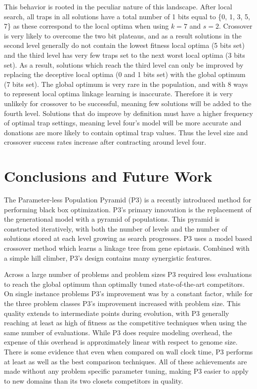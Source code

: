 \documentclass[twoside]{article}
\begin{document}
This behavior is rooted in the peculiar nature
of this landscape.
After local search, all traps in all solutions have a total
number of 1 bits equal to \{0, 1, 3, 5, 7\} as these correspond to the local
optima when using $k=7$ and $s=2$. Crossover is very likely to overcome the
two bit plateaus, and as a result solutions in the second level generally do not
contain the lowest fitness local optima (5 bits set) and the third
level has very few traps set to the next worst local optima (3 bits set). As a result,
solutions which reach the third level can only be improved by replacing the deceptive
local optima (0 and 1 bits set) with the global optimum (7 bits set).
The global optimum is very rare in the population, and with 8 ways to represent local optima
linkage learning is inaccurate. Therefore it is very unlikely for crossover to be successful,
meaning few solutions will be added to the fourth level. Solutions that do improve by
definition must have a higher frequency of optimal trap settings, meaning level four's model
will be more accurate and donations are more likely to contain optimal trap values.
Thus the level size and crossover success rates increase after contracting around level four.

\section{Conclusions and Future Work}
The Parameter-less Population Pyramid (P3) is a recently introduced method for performing black box
optimization. P3's primary innovation is the replacement of the generational model with a pyramid of populations.
This pyramid is constructed iteratively, with both the number of levels and the number of solutions stored
at each level growing as search progresses. P3 uses a model based crossover method
which learns a linkage tree from gene epistasis. Combined with a simple hill climber, P3's design contains
many synergistic features.

Across a large number of problems and problem sizes P3 required less evaluations to reach the global optimum
than optimally tuned state-of-the-art competitors. On single instance problems P3's improvement was by a
constant factor, while for the three problem classes P3's improvement increased with problem size. This
quality extends to intermediate points during evolution, with P3 generally reaching at least as high
of fitness as the competitive techniques when using the same number of evaluations. While P3 does require
modeling overhead, the expense of this overhead is approximately linear with respect to genome size. There
is some evidence that even when compared on wall clock time, P3 performs at least as well as
the best comparison techniques. All of these achievements are made without any problem specific parameter
tuning, making P3 easier to apply to new domains than its two closets competitors in quality.
\end{document}
